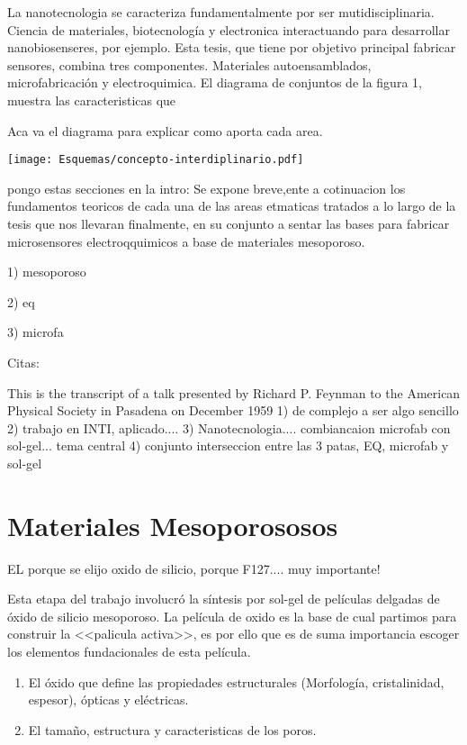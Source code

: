 La nanotecnologia se caracteriza fundamentalmente por ser mutidisciplinaria. Ciencia de materiales, biotecnología y electronica interactuando para desarrollar nanobiosenseres, por ejemplo. Esta tesis, que tiene por objetivo principal fabricar sensores, combina tres componentes. Materiales autoensamblados, microfabricación y electroquimica. 
El diagrama de conjuntos de la figura 1, muestra las caracteristicas que 

Aca va el diagrama para explicar como aporta cada area.


\begin{center}
	\texttt{[image: Esquemas/concepto-interdiplinario.pdf]}
\end{center}

 
pongo estas secciones en la intro:
Se expone breve,ente a cotinuacion los fundamentos teoricos de cada una de las areas etmaticas tratados a lo largo de la tesis que nos llevaran finalmente, en su conjunto a sentar las bases para fabricar microsensores electroqquimicos a base de materiales mesoporoso.

1) mesoporoso

2) eq

3) microfa

Citas:


This is the transcript of a talk presented by Richard P. Feynman to the American Physical Society
in Pasadena on December 1959
1) de complejo a ser algo sencillo \\
2) trabajo en INTI, aplicado....
3) Nanotecnologia.... combiancaion microfab con sol-gel... tema central
4) conjunto interseccion entre las 3 patas, EQ, microfab y sol-gel

\section{Materiales Mesoporososos}\label{sec:mesoporosos}

				EL porque se elijo oxido de silicio, porque F127.... muy importante!
				
				Esta etapa del trabajo involucró la síntesis por sol-gel de películas delgadas de óxido de silicio mesoporoso. La película de oxido es la base de cual partimos para construir la <<palicula activa>>, es por ello que es de suma importancia escoger los elementos fundacionales de esta película. \cite{Soler-Illia2002a,Brinker1999,Soler-Illia2006,Grosso2004,Innocenzi2013}


				\begin{enumerate}
					\item El óxido que define las propiedades estructurales (Morfología, cristalinidad, espesor), ópticas y eléctricas.
					\item El tamaño, estructura y caracteristicas de los poros.
				\end{enumerate}


